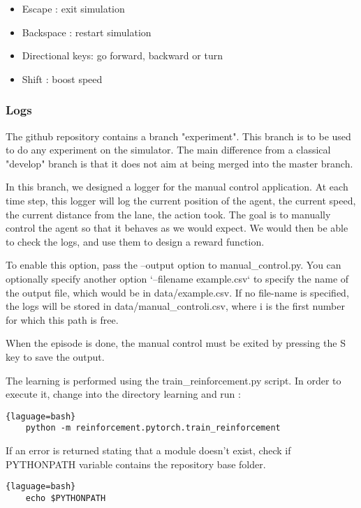 \documentclass[12pt]{article}
\begin{document}
\begin{itemize}
	\item Escape : exit simulation
	\item Backspace : restart simulation
	\item Directional keys: go forward, backward or turn
	\item Shift : boost speed
\end{itemize}

\subsubsection{Logs}
The github repository contains a branch "experiment". This branch is to be used to do any experiment on the simulator. The main difference from a classical "develop" branch is that it does not aim at being merged into the master branch. 

In this branch, we designed a logger for the manual control application. At each time step, this logger will log the current position of the agent, the current speed, the current distance from the lane, the action took. The goal is to manually control the agent so that it behaves as we would expect. We would then be able to check the logs, and use them to design a reward function.

To enable this option, pass the --output option to manual\_control.py. You can optionally specify another option `--filename example.csv` to specify the name of the output file, which would be in data/example.csv. If no file-name is specified, the logs will be stored in data/manual\_controli.csv, where i is the first number for which this path is free.

When the episode is done, the manual control must be exited by pressing the S key to save the output.

The learning is performed using the train\_reinforcement.py script. In order to execute it, change into the directory learning and run : 

\begin{lstlisting}{laguage=bash}
    python -m reinforcement.pytorch.train_reinforcement
\end{lstlisting}

If an error is returned stating that a module doesn't exist, check if PYTHONPATH variable contains the repository base folder.

\begin{lstlisting}{laguage=bash}
    echo $PYTHONPATH
\end{lstlisting}
\end{document}
